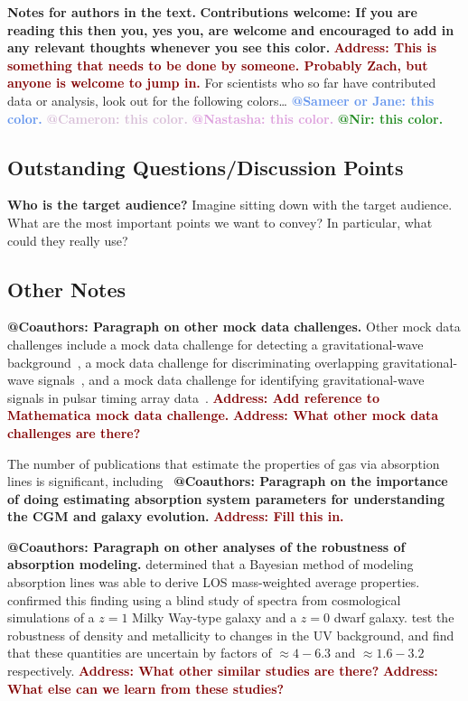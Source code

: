\documentclass[fleqn,usenatbib]{mnras}
\makeatletter
\newcommand{\thoughts}[1]{\textcolor{BurntOrange}{\textbf{Contributions welcome: #1}}}
\newcommand{\todo}[1]{\textcolor{Maroon}{\textbf{Address: #1}}}
\newcommand{\note}[1]{\textbf{@Coauthors: #1}}
\newcommand{\atsameer}[1]{\textcolor{CornflowerBlue}{\textbf{@Sameer or Jane: #1}}}
\newcommand{\atcameron}[1]{\textcolor{Thistle}{\textbf{@Cameron: #1}}}
\newcommand{\atnastasha}[1]{\textcolor{Plum}{\textbf{@Nastasha: #1}}}
\newcommand{\atnir}[1]{\textcolor{ForestGreen}{\textbf{@Nir: #1}}}
\makeatother
\begin{document}
\textbf{Notes for authors in the text.}
\thoughts{If you are reading this then you, yes you, are welcome and encouraged to add in any relevant thoughts whenever you see this color.}
\todo{This is something that needs to be done by someone. Probably Zach, but anyone is welcome to jump in.}
For scientists who so far have contributed data or analysis, look out for the following colors\ldots
\atsameer{this color.}
\atcameron{this color.}
\atnastasha{this color.}
\atnir{this color.}

\subsection{Outstanding Questions/Discussion Points}

\textbf{Who is the target audience?}
Imagine sitting down with the target audience.
What are the most important points we want to convey?
In particular, what could they really use?

\subsection{Other Notes}

\note{Paragraph on other mock data challenges.}
Other mock data challenges include a mock data challenge for detecting a gravitational-wave background~\cite{Meacher2015}, a mock data challenge for discriminating overlapping gravitational-wave signals~\cite{Regimbau2012},  and a mock data challenge for identifying gravitational-wave signals in pulsar timing array data~\cite{Hazboun2019}.
\todo{Add reference to Mathematica mock data challenge.}
\todo{What other mock data challenges are there?}

The number of publications that estimate the properties of gas via absorption lines is significant, including~\citep[e.g.][]{Churchill1996}
\note{Paragraph on the importance of doing estimating absorption system parameters for understanding the CGM and galaxy evolution.}
\todo{Fill this in.}

\note{Paragraph on other analyses of the robustness of absorption modeling.}
\cite{Liang2018} determined that a Bayesian method of modeling absorption lines was able to derive LOS mass-weighted average properties.
\cite{Marra2021} confirmed this finding using a blind study of spectra from cosmological simulations of a $z=1$ Milky Way-type galaxy and a $z=0$ dwarf galaxy.
\cite{Acharya2021} test the robustness of density and metallicity to changes in the UV background, and find that these quantities are uncertain by factors of $\approx 4-6.3$ and $\approx 1.6-3.2$ respectively.
\cite{Sameer2021} 
\todo{What other similar studies are there?}
\todo{What else can we learn from these studies?}
\end{document}
